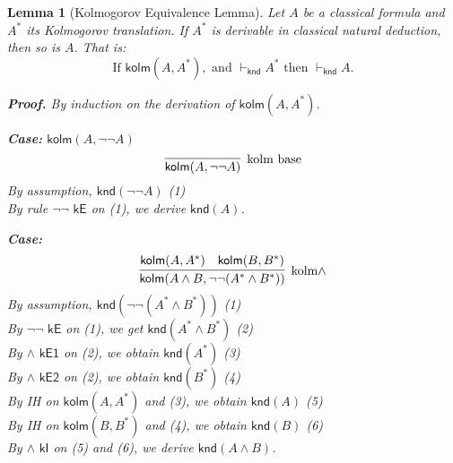\documentclass{article}
\newtheorem{lemma}{Lemma}
\begin{document}
    \bigskip

  \begin{lemma}[Kolmogorov Equivalence Lemma]
    \label{lem:equiv}
    Let $A$ be a classical formula and $A^*$ its Kolmogorov translation. If $A^*$ is derivable in classical natural deduction, then so is $A$. That is:
    \[
    \text{If } \textsf{kolm}(A, A^*), \text{ and } \vdash_{\textsf{knd}} A^* \text{ then } \vdash_{\textsf{knd}} A.
    \]
    
    \textbf{Proof.}  
    By induction on the derivation of $\textsf{kolm}(A, A^*)$.
    
    \medskip

    \noindent \textbf{Case:} $\textsf{kolm}(A, \neg\neg A)$  
    \[
    \infer[\text{kolm base}]{\textsf{kolm}(A, \neg\neg A)}{}
    \]
    By assumption, $\textsf{knd}(\neg\neg A)$ \hfill (1)\\
    By rule $\textsf{$\neg\neg$ kE}$ on (1), we derive $\textsf{knd}(A)$.
    
    \medskip
    
    \noindent \textbf{Case:} 
    \[
    \infer[\text{kolm$\wedge$}]{\textsf{kolm}(A \wedge B, \neg\neg (A^* \wedge B^*))}{
      \textsf{kolm}(A, A^*) \quad \textsf{kolm}(B, B^*)
    }
    \]
    By assumption, $\textsf{knd}(\neg\neg (A^* \wedge B^*))$ \hfill (1)\\
    By $\textsf{$\neg\neg$ kE}$ on (1), we get $\textsf{knd}(A^* \wedge B^*)$ \hfill (2)\\
    By $\textsf{$\wedge$ kE1}$ on (2), we obtain $\textsf{knd}(A^*)$ \hfill (3)\\
    By $\textsf{$\wedge$ kE2}$ on (2), we obtain $\textsf{knd}(B^*)$ \hfill (4)\\
    By IH on $\textsf{kolm}(A, A^*)$ and (3), we obtain $\textsf{knd}(A)$ \hfill (5)\\
    By IH on $\textsf{kolm}(B, B^*)$ and (4), we obtain $\textsf{knd}(B)$ \hfill (6)\\
    By $\textsf{$\wedge$ kI}$ on (5) and (6), we derive $\textsf{knd}(A \wedge B)$.
    
    \medskip
    

\end{lemma}
\end{document}
